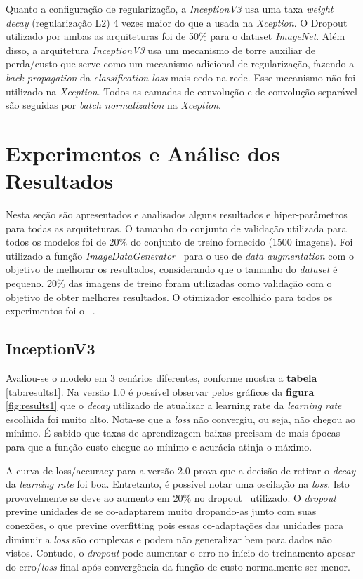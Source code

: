 \documentclass{bmvc2k}
\begin{document}
Quanto a configuração de regularização, a \textit{InceptionV3} usa uma taxa \textit{weight decay} (regularização L2) 4 vezes maior do que a usada na \textit{Xception}. O Dropout utilizado por ambas as arquiteturas foi de 50\% para o dataset \textit{ImageNet}. Além disso, a arquitetura \textit{InceptionV3} usa um mecanismo de torre auxiliar de perda/custo que serve como um mecanismo adicional de regularização, fazendo a \textit{back-propagation} da \textit{classification loss} mais cedo na rede. Esse mecanismo não foi utilizado na \textit{Xception}. Todos as camadas de convolução e de convolução separável são seguidas por \textit{batch normalization} na \textit{Xception}.
\section{Experimentos e Análise dos Resultados}
Nesta seção são apresentados e analisados alguns resultados e hiper-parâmetros para todas as arquiteturas. O tamanho do conjunto de validação utilizada para todos os modelos foi de 20\% do conjunto de treino fornecido (1500 imagens). Foi utilizado a função \textit{ImageDataGenerator}~\cite{keras} para o uso de \textit{data augmentation} com o objetivo de melhorar os resultados, considerando que o tamanho do \textit{dataset} é pequeno. 20\% das imagens de treino foram utilizadas como validação com o objetivo de obter melhores resultados. O otimizador escolhido para todos os experimentos foi o ~\cite{sgd}.
\subsection{InceptionV3}
Avaliou-se o modelo em 3 cenários diferentes, conforme mostra a \textbf{tabela} \ref{tab:results1}. Na versão 1.0 é possível observar pelos gráficos da \textbf{figura} \ref{fig:results1} que o \textit{decay} utilizado de atualizar a learning rate  da \textit{learning rate} escolhida foi muito alto. Nota-se que a \textit{loss} não convergiu, ou seja, não chegou ao mínimo. É sabido que taxas de aprendizagem baixas precisam de mais épocas para que a função custo chegue ao mínimo e acurácia atinja o máximo. 
 
A curva de loss/accuracy para a versão 2.0 prova que a decisão de retirar o \textit{decay} da \textit{learning rate} foi boa. Entretanto, é possível notar uma oscilação na \textit{loss}. Isto provavelmente se deve ao aumento em 20\% no dropout~\cite{dropout} utilizado. O \textit{dropout} previne unidades de se co-adaptarem muito dropando-as junto com suas conexões, o que previne overfitting pois essas co-adaptações das unidades para diminuir a \textit{loss} são complexas e podem não generalizar bem para dados não vistos. Contudo, o \textit{dropout} pode aumentar o erro no início do treinamento apesar do erro/\textit{loss} final após convergência da função de custo normalmente ser menor. 
\end{document}
